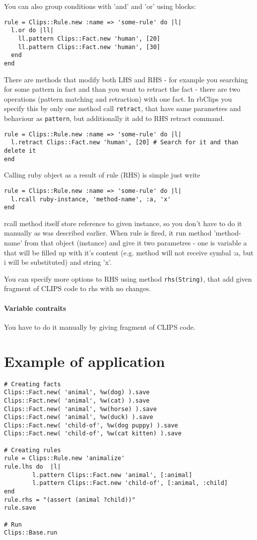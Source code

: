 \documentclass[a4paper,10pt]{article}
\begin{document}
You can also group conditions with 'and' and 'or' using blocks:
\begin{verbatim}
rule = Clips::Rule.new :name => 'some-rule' do |l|
  l.or do |ll|
    ll.pattern Clips::Fact.new 'human', [20]
    ll.pattern Clips::Fact.new 'human', [30]
  end
end
\end{verbatim}

There are methods that modify both LHS and RHS - for example you searching for some pattern in fact and than you want to retract the fact - there are two operations (pattern matching and retraction) with one fact. In rbClips you specify this by only one method call \texttt{retract}, that have same parametres and behaviour as \texttt{pattern}, but additionally it add to RHS retract command.
\begin{verbatim}
rule = Clips::Rule.new :name => 'some-rule' do |l|
  l.retract Clips::Fact.new 'human', [20] # Search for it and than delete it
end
\end{verbatim}

Calling ruby object as a result of rule (RHS) is simple just write
\begin{verbatim}
rule = Clips::Rule.new :name => 'some-rule' do |l|
  l.rcall ruby-instance, 'method-name', :a, 'x'
end
\end{verbatim}
rcall method itself store reference to given instance, so you don't have to do it manually as was described earlier. When rule is fired, it run method 'method-name' from that object (instance) and give it two parametres - one is variable a that will be filled up with it's content (e.g. method will not receive symbal :a, but i will be substituted) and string 'x'.

You can specify more options to RHS using method \texttt{rhs(String)}, that add given fragment of CLIPS code to rhs with no changes.

\paragraph{Variable contraits}
You have to do it manually by giving fragment of CLIPS code.

\section{Example of application}
\begin{verbatim}
# Creating facts
Clips::Fact.new( 'animal', %w(dog) ).save
Clips::Fact.new( 'animal', %w(cat) ).save
Clips::Fact.new( 'animal', %w(horse) ).save
Clips::Fact.new( 'animal', %w(duck) ).save
Clips::Fact.new( 'child-of', %w(dog puppy) ).save
Clips::Fact.new( 'child-of', %w(cat kitten) ).save

# Creating rules
rule = Clips::Rule.new 'animalize'
rule.lhs do  |l|
        l.pattern Clips::Fact.new 'animal', [:animal]
        l.pattern Clips::Fact.new 'child-of', [:animal, :child]
end
rule.rhs = "(assert (animal ?child))"
rule.save

# Run
Clips::Base.run\end{verbatim}
\end{document}
